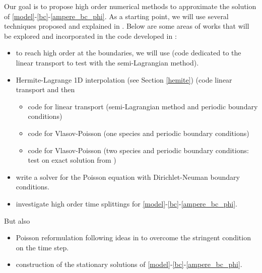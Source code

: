 \documentclass[12pt,english]{article}
\theoremstyle{plain}\newtheorem{theorem}{Theorem}[section]
\theoremstyle{plain}\newtheorem{corollary}{Corollary}[section]
\theoremstyle{plain}\newtheorem{lemma}{Lemma}[section]
\begin{document}
Our goal is to propose high order numerical methods to approximate the solution of \eqref{model}-\eqref{bc}-\eqref{ampere_bc_phi}. 
As a starting point, we will use several techniques proposed and explained in \cite{badsi}. Below are some areas of works 
that will be explored and incorporated in the code developed in \cite{badsi}:  
\begin{itemize}
\item to reach high order at the boundaries, we will use \cite{boutin, coulombel} (code dedicated to the linear transport to test 
with the semi-Lagrangian method). 
\item Hermite-Lagrange 1D interpolation  (see Section \ref{hemite}) (code linear transport and then 
\begin{itemize}
\item code for linear transport (semi-Lagrangian method and periodic boundary conditions) 
\item code for Vlasov-Poisson (one species and periodic boundary conditions)
\item code for Vlasov-Poisson (two species and periodic boundary conditions: test on exact solution from \cite{morel}) 
\end{itemize}
\item write a solver for the Poisson equation with Dirichlet-Neuman boundary conditions. 
\item investigate high order time splittings for \eqref{model}-\eqref{bc}-\eqref{ampere_bc_phi}.  
\end{itemize}
But also
\begin{itemize}
\item Poisson reformulation following ideas in \cite{degond} to overcome the stringent condition on the time step. 
\item construction of the stationary solutions of  \eqref{model}-\eqref{bc}-\eqref{ampere_bc_phi}.  
\end{itemize}

\end{document}
